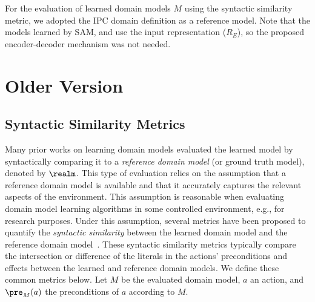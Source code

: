 For the evaluation of learned domain models $M$ using the syntactic similarity metric, we adopted the IPC domain definition as a reference model. 
Note that the models learned by SAM, \offlam{} and \nolam{} use the input representation ($R_E$), so the proposed encoder-decoder mechanism was not needed.
%







\section{Older Version}







\subsection{Syntactic Similarity Metrics}
Many prior works on learning domain models evaluated the learned model by syntactically comparing it to a \emph{reference domain model} (or ground truth model), denoted by $\realm$. This type of evaluation relies on the assumption that a reference domain model 
is available and that it accurately captures the relevant aspects of the environment. 
This assumption is reasonable when evaluating domain model learning algorithms in some controlled environment, e.g., for research purposes. 
Under this assumption, several metrics have been proposed to quantify the \emph{syntactic similarity} between the learned domain model and the reference domain model~\citep{garrido2024challenges,mordoch2023safe,xi2024neuro,Oswald2024DLLMDomainModeling}.
These syntactic similarity metrics typically compare the intersection or difference of the literals in the actions' preconditions and effects between the learned and reference domain models. 
We define these common metrics below. 
Let $M$ be the evaluated domain model, $a$ an action, and $\pre_M(a)$ the preconditions of $a$ according to $M$.

